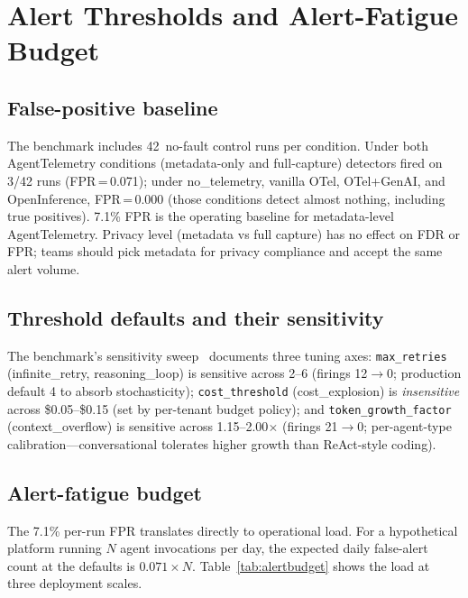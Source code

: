 \documentclass[conference]{IEEEtran}
\begin{document}
\section{Alert Thresholds and Alert-Fatigue Budget}
\label{sec:alerts}

\subsection{False-positive baseline}

The benchmark includes 42~no-fault control runs per condition.
Under both AgentTelemetry conditions (metadata-only and
full-capture) detectors fired on 3/42 runs (FPR\,=\,0.071); under
no\_telemetry, vanilla OTel, OTel+GenAI, and OpenInference,
FPR\,=\,0.000 (those conditions detect almost nothing, including
true positives). 7.1\% FPR is the operating baseline for
metadata-level AgentTelemetry. Privacy level (metadata vs full
capture) has no effect on FDR or FPR; teams should pick metadata
for privacy compliance and accept the same alert volume.

\subsection{Threshold defaults and their sensitivity}

The benchmark's sensitivity sweep~\cite{agenttelemetry_aiware}
documents three tuning axes: \texttt{max\_retries}
(infinite\_retry, reasoning\_loop) is sensitive across 2--6
(firings 12$\to$0; production default 4 to absorb stochasticity);
\texttt{cost\_threshold} (cost\_explosion) is \emph{insensitive}
across \$0.05--\$0.15 (set by per-tenant budget policy); and
\texttt{token\_growth\_factor} (context\_overflow) is sensitive
across 1.15--2.00$\times$ (firings 21$\to$0; per-agent-type
calibration---conversational tolerates higher growth than
ReAct-style coding).

\subsection{Alert-fatigue budget}

The 7.1\% per-run FPR translates directly to operational load. For a
hypothetical platform running $N$ agent invocations per day, the
expected daily false-alert count at the defaults is
$0.071 \times N$. Table~\ref{tab:alertbudget} shows the load at three
deployment scales.
\end{document}
